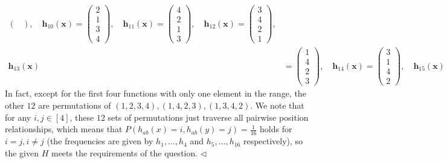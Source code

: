 \documentclass[11pt]{article}
\newenvironment{answer}[1][Answer]{\begin{trivlist}
\item[\hskip \labelsep {\bfseries #1.}\hskip \labelsep]}{\hfill$\lhd$\end{trivlist}}
\begin{document}
\begin{answer}
\[\begin{aligned}
\begin{pmatrix}
\end{pmatrix}, \quad
\bm{h}_{10}(\bm{x}) = 
\begin{pmatrix}
2 \\ 1 \\ 3 \\ 4
\end{pmatrix}, \quad
\bm{h}_{11}(\bm{x}) = 
\begin{pmatrix}
4 \\ 2 \\ 1 \\ 3
\end{pmatrix}, \quad
\bm{h}_{12}(\bm{x}) = 
\begin{pmatrix}
3 \\ 4 \\ 2 \\ 1
\end{pmatrix}, \\
\bm{h}_{13}(\bm{x}) &= 
\begin{pmatrix}
1 \\ 4 \\ 2 \\ 3
\end{pmatrix}, \quad
\bm{h}_{14}(\bm{x}) = 
\begin{pmatrix}
3 \\ 1 \\ 4 \\ 2
\end{pmatrix}, \quad
\bm{h}_{15}(\bm{x}) = 
\begin{pmatrix}
2 \\ 3 \\ 1 \\ 4
\end{pmatrix}, \quad
\bm{h}_{16}(\bm{x}) = 
\begin{pmatrix}
4 \\ 3 \\ 2 \\ 1
\end{pmatrix}.
\end{aligned}
\]
In fact, except for the first four functions with only one element in the range, the other $12$ are permutations of $(1,2,3,4),(1,4,2,3),(1,3,4,2)$. We note that for any $i,j\in [4]$, these $12$ sets of permutations just traverse all pairwise position relationships, which means that $P(h_{ab}(x) = i,h_{ab}(y) = j)=\frac{1}{16}$ holds for $i=j,i\neq j$ (the frequencies are given by $h_1,\dots,h_4$ and $h_{5},\dots,h_{16}$ respectively), so the given $H$ meets the requirements of the question.
\end{answer}
\end{document}
